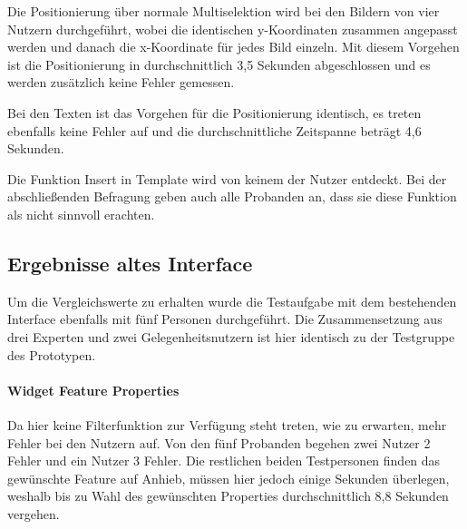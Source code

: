 Die Positionierung über normale Multiselektion wird bei den Bildern von vier Nutzern durchgeführt, wobei die identischen y-Koordinaten zusammen angepasst werden und danach die x-Koordinate für jedes Bild einzeln.
Mit diesem Vorgehen ist die Positionierung in durchschnittlich 3,5 Sekunden abgeschlossen und es werden zusätzlich keine Fehler gemessen.

Bei den Texten ist das Vorgehen für die Positionierung identisch, es treten ebenfalls keine Fehler auf und die durchschnittliche Zeitspanne beträgt 4,6 Sekunden.

Die Funktion \glqq Insert in Template\grqq{} wird von keinem der Nutzer entdeckt. Bei der abschließenden Befragung geben auch alle Probanden an, dass sie diese Funktion als nicht sinnvoll erachten.

\subsection{Ergebnisse altes Interface}
Um die Vergleichswerte zu erhalten wurde die Testaufgabe mit dem bestehenden Interface ebenfalls mit fünf Personen durchgeführt.
Die Zusammensetzung aus drei Experten und zwei Gelegenheitsnutzern ist hier identisch zu der Testgruppe des Prototypen.

\paragraph{Widget Feature Properties}
Da hier keine Filterfunktion zur Verfügung steht treten, wie zu erwarten, mehr Fehler bei den Nutzern auf.
Von den fünf Probanden begehen zwei Nutzer 2 Fehler und ein Nutzer 3 Fehler.
Die restlichen beiden Testpersonen finden das gewünschte Feature auf Anhieb, müssen hier jedoch einige Sekunden überlegen, weshalb bis zu Wahl des gewünschten Properties durchschnittlich 8,8 Sekunden vergehen.

